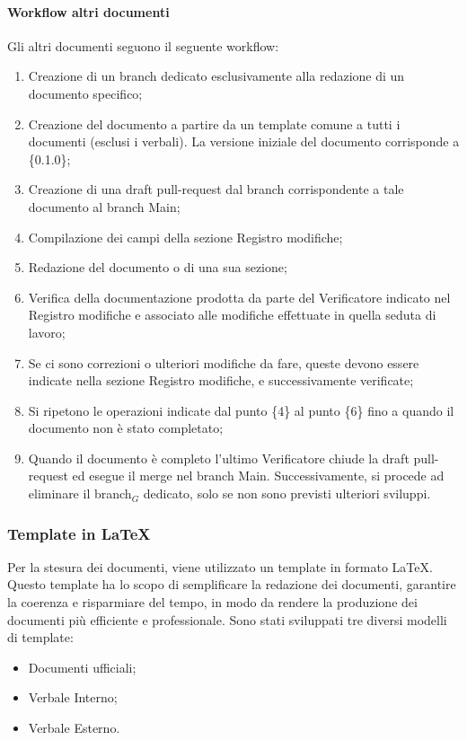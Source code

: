 \documentclass[10pt]{article}
\begin{document}
\begin{justify}
        \paragraph{Workflow altri documenti}
        Gli altri documenti seguono il seguente workflow:
        \begin{enumerate}
            \item Creazione di un branch dedicato esclusivamente alla redazione di un documento specifico;
            \item Creazione del documento a partire da un template comune a tutti i documenti (esclusi i verbali). La versione iniziale del documento corrisponde a \{0.1.0\};
            \item Creazione di una draft pull-request dal branch corrispondente a tale documento al branch Main;
            \item Compilazione dei campi della sezione Registro modifiche;
            \item Redazione del documento o di una sua sezione;
            \item Verifica della documentazione prodotta da parte del Verificatore indicato nel Registro modifiche e associato alle modifiche effettuate in quella seduta di lavoro;
            \item Se ci sono correzioni o ulteriori modifiche da fare, queste devono essere indicate nella sezione Registro modifiche, e successivamente verificate;
            \item Si ripetono le operazioni indicate dal punto \{4\} al punto \{6\} fino a quando il documento non è stato completato;
            \item Quando il documento è completo l'ultimo Verificatore
            chiude la draft pull-request ed esegue il merge nel branch Main. Successivamente, si procede ad eliminare il branch$_G$ dedicato, solo se non sono previsti ulteriori sviluppi.
        \end{enumerate}

    \subsubsection{Template in \LaTeX}
    Per la stesura dei documenti, viene utilizzato un template in formato \LaTeX. Questo template ha lo scopo di semplificare la redazione dei documenti, garantire la coerenza e risparmiare del tempo, in modo da rendere la produzione dei documenti più efficiente e professionale. Sono stati sviluppati tre diversi modelli di template:
    \begin{itemize}
        \item Documenti ufficiali;
        \item Verbale Interno;
        \item Verbale Esterno.
    \end{itemize}


\end{justify}
\end{document}
